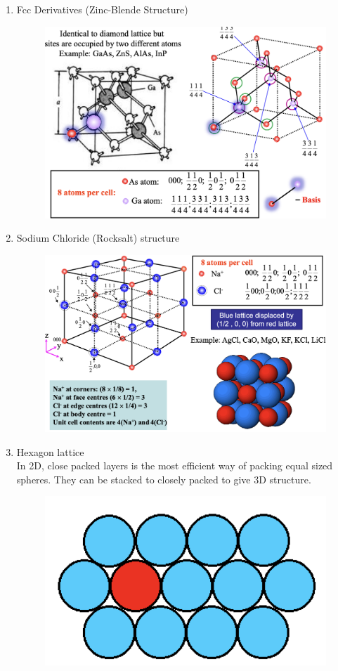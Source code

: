 \begin{enumerate}
\begin{figure}[h]
    \end{figure} 
    \newpage
    \item Fcc Derivatives (Zinc-Blende Structure) 
    \begin{figure}[h]
        \centering
        \includegraphics[width=0.75\linewidth]{image/zincblende.png}
    \end{figure}
    \item Sodium Chloride (Rocksalt) structure
    \begin{figure}[h]
        \centering
        \includegraphics[width=0.75\linewidth]{image/rockcet.png}
    \end{figure}
    \newpage
    \item Hexagon lattice \\
    In 2D, close packed layers is the most efficient way of packing equal sized spheres. They can be stacked to closely packed to give 3D structure.
    \begin{figure}[h]
        \centering
        \includegraphics[width=0.5\linewidth]{image/2dgraph.png}

\end{figure}
\end{enumerate}
